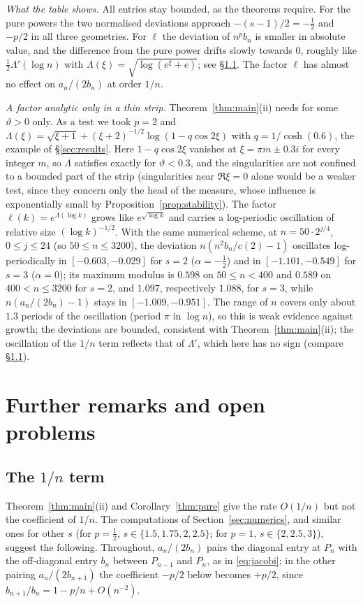 \emph{What the table shows.} All entries stay bounded, as the theorems require. For the pure powers the two
normalised deviations approach $-(s-1)/2=-\frac12$ and $-p/2$ in all three geometries. For $\ell$ the deviation of
$n^pb_n$ is smaller in absolute value, and the difference from the pure power drifts slowly towards $0$, roughly like
$\frac12\Lambda'(\log n)$ with $\Lambda(\xi)=\sqrt{\log(e^\xi+e)}$; see \S\ref{sec:tilt}. The factor $\ell$ has almost
no effect on $a_n/(2b_n)$ at order $1/n$.

\emph{A factor analytic only in a thin strip.} Theorem~\ref{thm:main}(ii) needs \Ath{\vartheta} for some $\vartheta>0$
only. As a test we took $p=2$ and $\Lambda(\xi)=\sqrt{\xi+1}+(\xi+2)^{-1/2}\log(1-q\cos2\xi)$ with $q=1/\cosh(0.6)$, the
example of \S\ref{sec:results}. Here $1-q\cos2\xi$ vanishes at $\xi=\pi m\pm0.3i$ for every integer $m$, so $\Lambda$
satisfies \Ath{\vartheta} exactly for $\vartheta<0.3$, and the singularities are not confined to a bounded part of the strip
(singularities near $\Re\xi=0$ alone would be a weaker test, since they concern only the head of the measure, whose
influence is exponentially small by Proposition~\ref{prop:stability}). The factor
$\ell(k)=e^{\Lambda(\log k)}$ grows like $e^{\sqrt{\log k}}$ and carries a log-periodic oscillation of relative size
$(\log k)^{-1/2}$. With the same numerical scheme, at $n=50\cdot2^{j/4}$, $0\le j\le24$ (so $50\le n\le3200$), the
deviation $n(n^2b_n/c(2)-1)$ oscillates log-periodically in $[-0.603,-0.029]$ for $s=2$ ($\alpha=-\frac12$) and in
$[-1.101,-0.549]$ for $s=3$ ($\alpha=0$); its maximum modulus is $0.598$ on $50\le n<400$ and $0.589$ on $400<n\le3200$ for
$s=2$, and $1.097$, respectively $1.088$, for $s=3$, while $n(a_n/(2b_n)-1)$ stays in $[-1.009,-0.951]$. The range of $n$
covers only about $1.3$ periods of the oscillation (period $\pi$ in $\log n$), so this is weak evidence against growth; the
deviations are bounded, consistent with Theorem~\ref{thm:main}(ii); the
oscillation of the $1/n$ term reflects that of $\Lambda'$, which here has no sign (compare \S\ref{sec:tilt}).

\section{Further remarks and open problems}\label{sec:further}

\subsection{\texorpdfstring{The $1/n$ term}{The 1/n term}}\label{sec:tilt}
Theorem~\ref{thm:main}(ii) and Corollary~\ref{thm:pure} give the rate $O(1/n)$ but not the coefficient of $1/n$. The
computations of Section~\ref{sec:numerics}, and similar ones for other $s$ (for $p=\frac12$,
$s\in\{1.5,1.75,2,2.5\}$; for $p=1$, $s\in\{2,2.5,3\}$), suggest the following. Throughout, $a_n/(2b_n)$ pairs the
diagonal entry at $P_n$ with the off-diagonal entry $b_n$ between $P_{n-1}$ and $P_n$, as in \eqref{eq:jacobi}; in
the other pairing $a_n/(2b_{n+1})$ the coefficient $-p/2$ below becomes $+p/2$, since $b_{n+1}/b_n=1-p/n+O(n^{-2})$.

